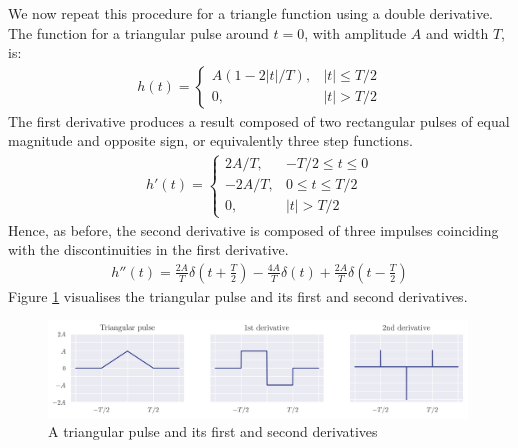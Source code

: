\documentclass[a4paper, 11pt]{article}
\begin{document}
We now repeat this procedure for a triangle function using a double derivative.
The function for a triangular pulse around $t=0$, with amplitude $A$ and width $T$, is:
\begin{align*}
    h(t) = \begin{cases}
        A(1 - 2|t|/T), & |t| \leq T/2 \\
        0,             & |t| > T/2
    \end{cases}
\end{align*}
The first derivative produces a result composed of two rectangular pulses of
equal magnitude and opposite sign, or equivalently three step functions.
\begin{align*}
    h'(t) = \begin{cases}
        2A/T, & -T/2 \leq t \leq 0 \\
       -2A/T, &  0 \leq t \leq T/2 \\
        0,    & |t| > T/2
    \end{cases}
\end{align*}
Hence, as before, the second derivative is composed of three impulses coinciding
with the discontinuities in the first derivative.
\begin{align*}
    h''(t) = \frac{2A}{T}\delta(t+\frac{T}{2}) -
             \frac{4A}{T}\delta(t) +
             \frac{2A}{T}\delta(t-\frac{T}{2})
\end{align*}
Figure \ref{fig:q1_triangular} visualises the triangular pulse and its first and
second derivatives.

\begin{figure}[ht]
    \centering
    \includegraphics[width=0.99\textwidth]{images/q1_triangular.png}
    \caption{A triangular pulse and its first and second derivatives}
    \label{fig:q1_triangular}
\end{figure}
\end{document}
